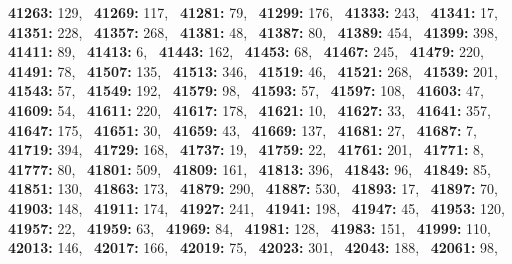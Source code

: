 \textbf{41263:} 129,\allowbreak~ 
\textbf{41269:} 117,\allowbreak~ 
\textbf{41281:} 79,\allowbreak~ 
\textbf{41299:} 176,\allowbreak~ 
\textbf{41333:} 243,\allowbreak~ 
\textbf{41341:} 17,\allowbreak~ 
\textbf{41351:} 228,\allowbreak~ 
\textbf{41357:} 268,\allowbreak~ 
\textbf{41381:} 48,\allowbreak~ 
\textbf{41387:} 80,\allowbreak~ 
\textbf{41389:} 454,\allowbreak~ 
\textbf{41399:} 398,\allowbreak~ 
\textbf{41411:} 89,\allowbreak~ 
\textbf{41413:} 6,\allowbreak~ 
\textbf{41443:} 162,\allowbreak~ 
\textbf{41453:} 68,\allowbreak~ 
\textbf{41467:} 245,\allowbreak~ 
\textbf{41479:} 220,\allowbreak~ 
\textbf{41491:} 78,\allowbreak~ 
\textbf{41507:} 135,\allowbreak~ 
\textbf{41513:} 346,\allowbreak~ 
\textbf{41519:} 46,\allowbreak~ 
\textbf{41521:} 268,\allowbreak~ 
\textbf{41539:} 201,\allowbreak~ 
\textbf{41543:} 57,\allowbreak~ 
\textbf{41549:} 192,\allowbreak~ 
\textbf{41579:} 98,\allowbreak~ 
\textbf{41593:} 57,\allowbreak~ 
\textbf{41597:} 108,\allowbreak~ 
\textbf{41603:} 47,\allowbreak~ 
\textbf{41609:} 54,\allowbreak~ 
\textbf{41611:} 220,\allowbreak~ 
\textbf{41617:} 178,\allowbreak~ 
\textbf{41621:} 10,\allowbreak~ 
\textbf{41627:} 33,\allowbreak~ 
\textbf{41641:} 357,\allowbreak~ 
\textbf{41647:} 175,\allowbreak~ 
\textbf{41651:} 30,\allowbreak~ 
\textbf{41659:} 43,\allowbreak~ 
\textbf{41669:} 137,\allowbreak~ 
\textbf{41681:} 27,\allowbreak~ 
\textbf{41687:} 7,\allowbreak~ 
\textbf{41719:} 394,\allowbreak~ 
\textbf{41729:} 168,\allowbreak~ 
\textbf{41737:} 19,\allowbreak~ 
\textbf{41759:} 22,\allowbreak~ 
\textbf{41761:} 201,\allowbreak~ 
\textbf{41771:} 8,\allowbreak~ 
\textbf{41777:} 80,\allowbreak~ 
\textbf{41801:} 509,\allowbreak~ 
\textbf{41809:} 161,\allowbreak~ 
\textbf{41813:} 396,\allowbreak~ 
\textbf{41843:} 96,\allowbreak~ 
\textbf{41849:} 85,\allowbreak~ 
\textbf{41851:} 130,\allowbreak~ 
\textbf{41863:} 173,\allowbreak~ 
\textbf{41879:} 290,\allowbreak~ 
\textbf{41887:} 530,\allowbreak~ 
\textbf{41893:} 17,\allowbreak~ 
\textbf{41897:} 70,\allowbreak~ 
\textbf{41903:} 148,\allowbreak~ 
\textbf{41911:} 174,\allowbreak~ 
\textbf{41927:} 241,\allowbreak~ 
\textbf{41941:} 198,\allowbreak~ 
\textbf{41947:} 45,\allowbreak~ 
\textbf{41953:} 120,\allowbreak~ 
\textbf{41957:} 22,\allowbreak~ 
\textbf{41959:} 63,\allowbreak~ 
\textbf{41969:} 84,\allowbreak~ 
\textbf{41981:} 128,\allowbreak~ 
\textbf{41983:} 151,\allowbreak~ 
\textbf{41999:} 110,\allowbreak~ 
\textbf{42013:} 146,\allowbreak~ 
\textbf{42017:} 166,\allowbreak~ 
\textbf{42019:} 75,\allowbreak~ 
\textbf{42023:} 301,\allowbreak~ 
\textbf{42043:} 188,\allowbreak~ 
\textbf{42061:} 98,\allowbreak~ 

